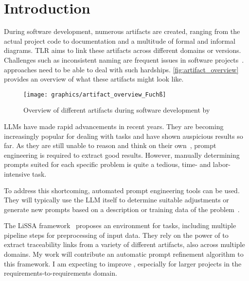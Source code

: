 
\chapter{Introduction}
\label{ch:Introduction}
During software development, numerous artifacts are created, ranging from the actual project code to documentation and a multitude of formal and informal diagrams.
\Acl{TLR} aims to link these artifacts across different domains or versions.
Challenges such as inconsistent naming are frequent issues in software projects~\cite{wohlrab2019ImprovingConsistency}.
\TLR approaches need to be able to deal with such hardships.
\autoref{fig:artifact_overview} provides an overview of what these artifacts might look like.

\begin{figure}
    \centering
    \texttt{[image: graphics/artifact\_overview\_Fuchß]}
    \caption{Overview of different artifacts during software development by }
    \label{fig:artifact_overview}
\end{figure}

\Aclp{LLM} have made rapid advancements in recent years.
They are becoming increasingly popular for dealing with \TLR tasks and have shown auspicious results so far.
As they are still unable to reason and think on their own~\cite{shojaee2025IllusionThinking}, prompt engineering is required to extract good results.
However, manually determining prompts suited for each specific problem is quite a tedious, time- and labor-intensive task.

To address this shortcoming, automated prompt engineering tools can be used.
They will typically use the LLM itself to determine suitable adjustments or generate new prompts based on a description or training data of the problem~\cite{ramnath2025SystematicSurvey}.

The LiSSA framework~\cite{fuchss2025LiSSAGeneric} proposes an environment for \TLR tasks, including multiple pipeline steps for preprocessing of input data.
They rely on the power of \LLMs to extract traceability links from a variety of different artifacts, also across multiple domains.
My work will contribute an automatic prompt refinement algorithm to this framework.
I am expecting to improve \TLR, especially for larger projects in the requirements-to-requirements domain.

